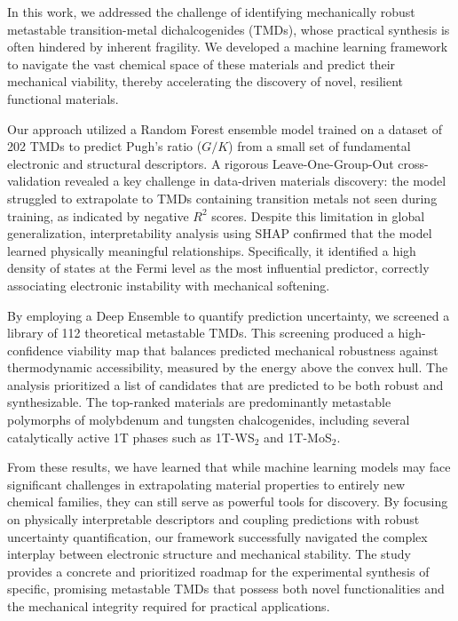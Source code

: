 \documentclass[]{article}
\begin{document}
In this work, we addressed the challenge of identifying mechanically robust metastable transition-metal dichalcogenides (TMDs), whose practical synthesis is often hindered by inherent fragility. We developed a machine learning framework to navigate the vast chemical space of these materials and predict their mechanical viability, thereby accelerating the discovery of novel, resilient functional materials.

Our approach utilized a Random Forest ensemble model trained on a dataset of 202 TMDs to predict Pugh's ratio ($G/K$) from a small set of fundamental electronic and structural descriptors. A rigorous Leave-One-Group-Out cross-validation revealed a key challenge in data-driven materials discovery: the model struggled to extrapolate to TMDs containing transition metals not seen during training, as indicated by negative $R^2$ scores. Despite this limitation in global generalization, interpretability analysis using SHAP confirmed that the model learned physically meaningful relationships. Specifically, it identified a high density of states at the Fermi level as the most influential predictor, correctly associating electronic instability with mechanical softening.

By employing a Deep Ensemble to quantify prediction uncertainty, we screened a library of 112 theoretical metastable TMDs. This screening produced a high-confidence viability map that balances predicted mechanical robustness against thermodynamic accessibility, measured by the energy above the convex hull. The analysis prioritized a list of candidates that are predicted to be both robust and synthesizable. The top-ranked materials are predominantly metastable polymorphs of molybdenum and tungsten chalcogenides, including several catalytically active 1T phases such as 1T-WS$_2$ and 1T-MoS$_2$.

From these results, we have learned that while machine learning models may face significant challenges in extrapolating material properties to entirely new chemical families, they can still serve as powerful tools for discovery. By focusing on physically interpretable descriptors and coupling predictions with robust uncertainty quantification, our framework successfully navigated the complex interplay between electronic structure and mechanical stability. The study provides a concrete and prioritized roadmap for the experimental synthesis of specific, promising metastable TMDs that possess both novel functionalities and the mechanical integrity required for practical applications.
\end{document}
